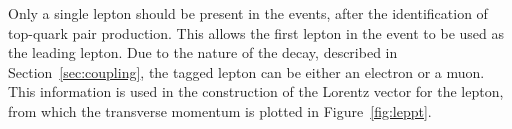 \documentclass[12pt,a4paper]{article}
\numberwithin{equation}{section}
\begin{document}
Only a single lepton should be present in the events, after the identification
of top-quark pair production. This allows the first lepton in the event to
be used as the leading lepton. Due to the nature of the decay, described in
Section~\ref{sec:coupling}, the tagged lepton can be either an electron or a
muon. This information is used in the construction of the Lorentz vector for the
lepton, from which the transverse momentum is plotted in Figure~\ref{fig:leppt}.\\
\end{document}
